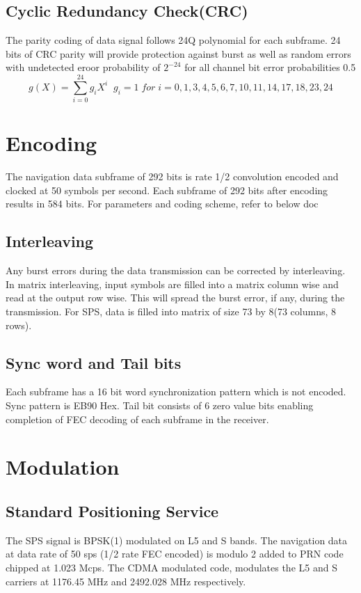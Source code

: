 \documentclass[11pt]{book}
\begin{document}
\subsection{Cyclic Redundancy Check(CRC)}
The parity coding of data signal follows 24Q polynomial for each subframe. 24 bits of CRC parity will provide protection against burst as well as random errors with undetected eroor probability of $2^{-24}$ for all channel bit error probabilities 0.5
\begin{equation}
    g(X) = \sum_{i = 0}^{24}g_{i}X^i\;\;
    g_{i}=1\; for\; i = 0,1,3,4,5,6,7,10,11,14,17,18,23,24
\end{equation}
\section{Encoding}
The navigation data subframe of 292 bits is rate 1/2 convolution encoded and clocked at 50 symbols per second. Each subframe of 292 bits after encoding results in 584 bits. For parameters and coding scheme, refer to below doc
\subsection{Interleaving}
Any burst errors during the data transmission can be corrected by interleaving. In matrix interleaving, input symbols are filled into a matrix column wise and read at the output row wise. This will spread the burst error, if any, during the transmission. For SPS, data is filled into matrix of size 73 by 8(73 columns, 8 rows).
\subsection{Sync word and Tail bits}
Each subframe has a 16 bit word synchronization pattern which is not encoded. Sync pattern is EB90 Hex. Tail bit consists of 6 zero value bits enabling completion of FEC decoding of each subframe in the receiver.

\section{Modulation}
\subsection{Standard Positioning Service}
The SPS signal is BPSK(1) modulated on L5 and S bands. The navigation data at data rate of 50 sps (1/2 rate FEC encoded) is modulo 2 added to PRN code chipped at 1.023 Mcps. The CDMA modulated code, modulates the L5 and S carriers at 1176.45 MHz and 2492.028 MHz respectively.
\end{document}
